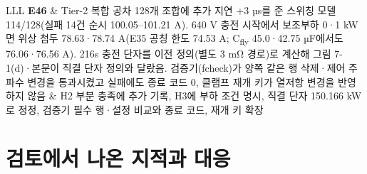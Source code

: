 {\begin{longtable}{L{\tabcolsep\relax}L{\tabcolsep\relax}L{\tabcolsep\relax}}
\textbf{E46} & Tier-2 복합 공차 128개 조합에 추가 지연 +3 µs를 준 스위칭 모델 114/128(실패 14건 순시 100.05–101.21 A). 640 V 충전 시작에서 보조부하 0·1 kW면 위상 첨두 78.63·78.74 A(E35 공칭 한도 74.53 A; C\textsubscript{fly} 45.0·42.75 µF에서도 76.06·76.56 A). 216s 충전 단자를 이전 정의(별도 3 mΩ 경로)로 계산해 그림 7-1(d)·본문이 직결 단자 정의와 달랐음. 검증기(fcheck)가 양쪽 같은 행 삭제·제어 주파수 변경을 통과시켰고 실패에도 종료 코드 0, 클램프 재개 키가 열저항 변경을 반영하지 않음 & H2 부분 충족에 추가 기록, H3에 부하 조건 명시, 직결 단자 150.166 kW로 정정, 검증기 필수 행·설정 비교와 종료 코드, 재개 키 확장 \\
\end{longtable}
}

\section{검토에서 나온 지적과 대응}

